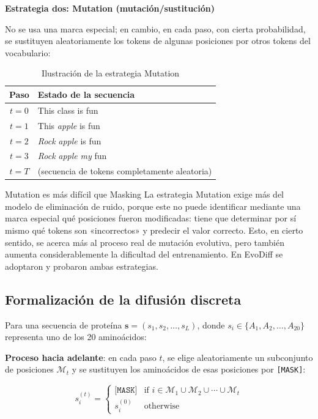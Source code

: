 \documentclass[a4paper]{article}
\begin{document}
\textbf{Estrategia dos: Mutation (mutación/sustitución)}

No se usa una marca especial; en cambio, en cada paso, con cierta probabilidad, se sustituyen aleatoriamente los tokens de algunas posiciones por otros tokens del vocabulario:

\begin{table}[H]
\centering
\caption{Ilustración de la estrategia Mutation}
\begin{tabular}{@{}cl@{}}
\toprule
\textbf{Paso} & \textbf{Estado de la secuencia} \\
\midrule
$t=0$ & This class is fun \\
$t=1$ & This \textit{apple} is fun \\
$t=2$ & \textit{Rock} \textit{apple} is fun \\
$t=3$ & \textit{Rock} \textit{apple} \textit{my} fun \\
$t=T$ & (secuencia de tokens completamente aleatoria) \\
\bottomrule
\end{tabular}
\end{table}

\begin{warningbox}{Mutation es más difícil que Masking}
La estrategia Mutation exige más del modelo de eliminación de ruido, porque este no puede identificar mediante una marca especial qué posiciones fueron modificadas: tiene que determinar por sí mismo qué tokens son «incorrectos» y predecir el valor correcto. Esto, en cierto sentido, se acerca más al proceso real de mutación evolutiva, pero también aumenta considerablemente la dificultad del entrenamiento. En EvoDiff se adoptaron y probaron ambas estrategias.
\end{warningbox}

\subsection{Formalización de la difusión discreta}

Para una secuencia de proteína $\mathbf{s} = (s_1, s_2, \ldots, s_L)$, donde $s_i \in \{A_1, A_2, \ldots, A_{20}\}$ representa uno de los 20 aminoácidos:

\textbf{Proceso hacia adelante}: en cada paso $t$, se elige aleatoriamente un subconjunto de posiciones $\mathcal{M}_t$ y se sustituyen los aminoácidos de esas posiciones por \texttt{[MASK]}:

$$s_i^{(t)} = \begin{cases} \texttt{[MASK]} & \text{if } i \in \mathcal{M}_1 \cup \mathcal{M}_2 \cup \cdots \cup \mathcal{M}_t \\ s_i^{(0)} & \text{otherwise} \end{cases}$$
\end{document}

